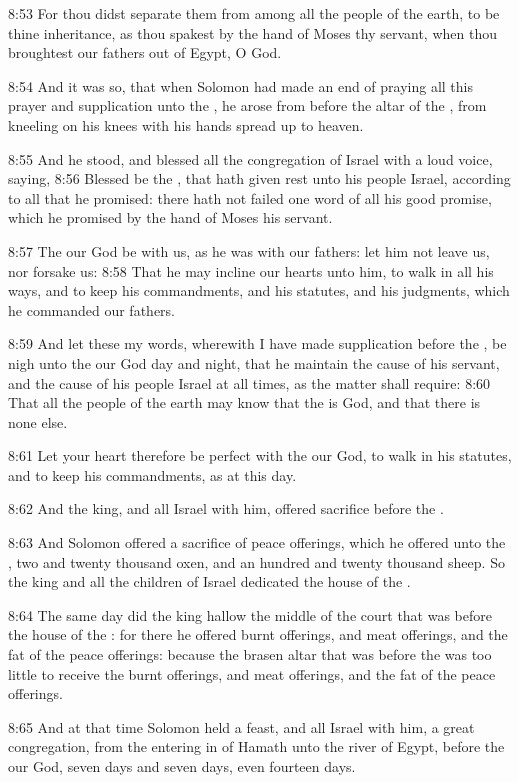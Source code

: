 8:53 For thou didst separate them from among all the people of the earth, to be thine inheritance, as thou spakest by the hand of Moses thy servant, when thou broughtest our fathers out of Egypt, O \LORD God.

8:54 And it was so, that when Solomon had made an end of praying all this prayer and supplication unto the \LORD, he arose from before the altar of the \LORD, from kneeling on his knees with his hands spread up to heaven.

8:55 And he stood, and blessed all the congregation of Israel with a loud voice, saying, 8:56 Blessed be the \LORD, that hath given rest unto his people Israel, according to all that he promised: there hath not failed one word of all his good promise, which he promised by the hand of Moses his servant.

8:57 The \LORD our God be with us, as he was with our fathers: let him not leave us, nor forsake us: 8:58 That he may incline our hearts unto him, to walk in all his ways, and to keep his commandments, and his statutes, and his judgments, which he commanded our fathers.

8:59 And let these my words, wherewith I have made supplication before the \LORD, be nigh unto the \LORD our God day and night, that he maintain the cause of his servant, and the cause of his people Israel at all times, as the matter shall require: 8:60 That all the people of the earth may know that the \LORD is God, and that there is none else.

8:61 Let your heart therefore be perfect with the \LORD our God, to walk in his statutes, and to keep his commandments, as at this day.

8:62 And the king, and all Israel with him, offered sacrifice before the \LORD.

8:63 And Solomon offered a sacrifice of peace offerings, which he offered unto the \LORD, two and twenty thousand oxen, and an hundred and twenty thousand sheep. So the king and all the children of Israel dedicated the house of the \LORD.

8:64 The same day did the king hallow the middle of the court that was before the house of the \LORD: for there he offered burnt offerings, and meat offerings, and the fat of the peace offerings: because the brasen altar that was before the \LORD was too little to receive the burnt offerings, and meat offerings, and the fat of the peace offerings.

8:65 And at that time Solomon held a feast, and all Israel with him, a great congregation, from the entering in of Hamath unto the river of Egypt, before the \LORD our God, seven days and seven days, even fourteen days.

